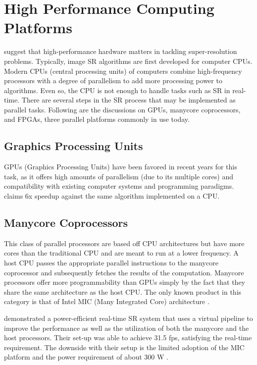 \section{High Performance Computing Platforms}
\cite{Yang2010a} suggest that high-performance hardware matters in tackling super-resolution problems. 
Typically, image SR algorithms are first developed for computer CPUs.
Modern CPUs (central processing units) of computers combine high-frequency processors with a degree of parallelism to add more processing power to algorithms.
Even so, the CPU is not enough to handle tasks such as SR in real-time.
There are several steps in the SR process that may be implemented as parallel tasks.
Following are the discussions on GPUs, manycore coprocessors, and FPGAs, three parallel platforms commonly in use today.

\subsection{Graphics Processing Units}

GPUs (Graphics Processing Units) have been favored in recent years for this task, as it offers high amounts of parallelism (due to its multiple cores) and compatibility with existing computer systems and programming paradigms.
\cite{Wu2011} claims 6x speedup against the same algorithm implemented on a CPU. 

\subsection{Manycore Coprocessors}
This class of parallel processors are based off CPU architectures but have more cores than the traditional CPU and are meant to run at a lower frequency. 
A host CPU passes the appropriate parallel instructions to the manycore coprocessor and subsequently fetches the results of the computation.
Manycore processors offer more programmability than GPUs simply by the fact that they share the same architecture as the host CPU. 
The only known product in this category is that of Intel MIC (Many Integrated Core) architecture \citep{Intel2014}.

\cite{Ishizaka2013} demonstrated a power-efficient real-time SR system that uses a virtual pipeline to improve the performance as well as the utilization of both the manycore and the host processors. 
Their set-up was able to achieve 31.5 fps, satisfying the real-time requirement.
The downside with their setup is the limited adoption of the MIC platform and the power requirement of about 300 W \citep{Intel2014}.


